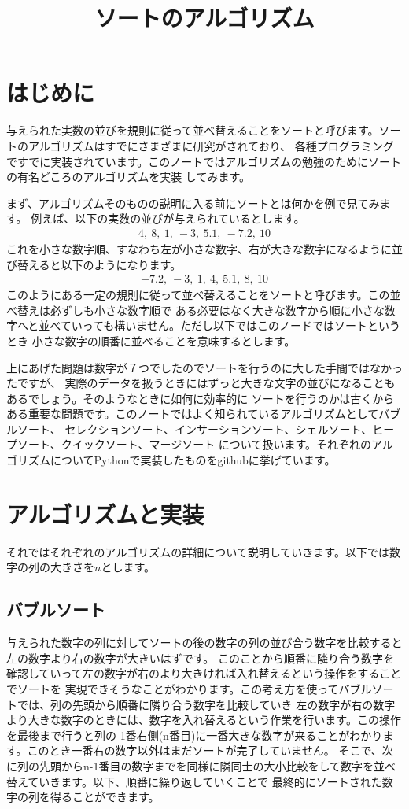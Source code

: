 \documentclass[dvipdfmx]{jarticle}
\title{ソートのアルゴリズム}
\author{}
\date{}
\begin{document}
\maketitle
\section{はじめに}
与えられた実数の並びを規則に従って並べ替えることをソートと呼びます。ソートのアルゴリズムはすでにさまざまに研究がされており、
各種プログラミングですでに実装されています。このノートではアルゴリズムの勉強のためにソートの有名どころのアルゴリズムを実装
してみます。

まず、アルゴリズムそのものの説明に入る前にソートとは何かを例で見てみます。
例えば、以下の実数の並びが与えられているとします。
\begin{eqnarray}
4,~8,~1,~-3,~5.1,~-7.2,~10
\end{eqnarray}
これを小さな数字順、すなわち左が小さな数字、右が大きな数字になるように並び替えると以下のようになります。
\begin{eqnarray}
-7.2,~-3,~1,~4,~5.1,~8,~10
\end{eqnarray}
このようにある一定の規則に従って並べ替えることをソートと呼びます。この並べ替えは必ずしも小さな数字順で
ある必要はなく大きな数字から順に小さな数字へと並べていっても構いません。ただし以下ではこのノードではソートというとき
小さな数字の順番に並べることを意味するとします。

上にあげた問題は数字が７つでしたのでソートを行うのに大した手間ではなかったですが、
実際のデータを扱うときにはずっと大きな文字の並びになることもあるでしょう。そのようなときに如何に効率的に
ソートを行うのかは古くからある重要な問題です。このノートではよく知られているアルゴリズムとしてバブルソート、
セレクションソート、インサーションソート、シェルソート、ヒープソート、クイックソート、マージソート
について扱います。それぞれのアルゴリズムについてPythonで実装したものをgithubに挙げています。

\section{アルゴリズムと実装}
それではそれぞれのアルゴリズムの詳細について説明していきます。以下では数字の列の大きさを$n$とします。
\subsection{バブルソート}
与えられた数字の列に対してソートの後の数字の列の並び合う数字を比較すると左の数字より右の数字が大きいはずです。
このことから順番に隣り合う数字を確認していって左の数字が右のより大きければ入れ替えるという操作をすることでソートを
実現できそうなことがわかります。この考え方を使ってバブルソートでは、列の先頭から順番に隣り合う数字を比較していき
左の数字が右の数字より大きな数字のときには、数字を入れ替えるという作業を行います。この操作を最後まで行うと列の
1番右側(n番目)に一番大きな数字が来ることがわかります。このとき一番右の数字以外はまだソートが完了していません。
そこで、次に列の先頭からn-1番目の数字までを同様に隣同士の大小比較をして数字を並べ替えていきます。以下、順番に繰り返していくことで
最終的にソートされた数字の列を得ることができます。
\end{document}
